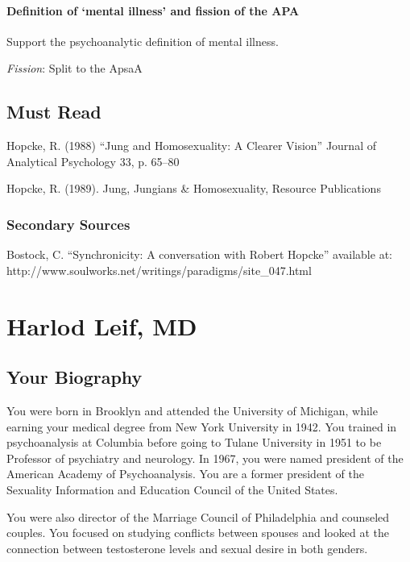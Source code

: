 \begin{refsection}
\subsubsection{Definition of ‘mental illness’ and fission of the APA}
\label{definitionof‘mentalillness’andfissionoftheapa}

Support the psychoanalytic definition of mental illness.

\emph{Fission}: Split to the ApsaA

\section{Must Read}
\label{mustread}

Hopcke, R. (1988) “Jung and Homosexuality: A Clearer Vision” Journal of Analytical Psychology 33, p. 65--80

Hopcke, R. (1989). Jung, Jungians \& Homosexuality, Resource Publications

\subsection{Secondary Sources}
\label{secondarysources}

Bostock, C. “Synchronicity: A conversation with Robert Hopcke” available at: http:\slash \slash www.soulworks.net\slash writings\slash paradigms\slash site\_047.html

\chapter{Harlod Leif, MD}
\label{harlodleifmd}

\section{Your Biography}
\label{yourbiography}

You were born in Brooklyn and attended the University of Michigan, while earning your medical degree from New York University in 1942. You trained in psychoanalysis at Columbia before going to Tulane University in 1951 to be Professor of psychiatry and neurology. In 1967, you were named president of the American Academy of Psychoanalysis. You are a former president of the Sexuality Information and Education Council of the United States.

You were also director of the Marriage Council of Philadelphia and counseled couples. You focused on studying conflicts between spouses and looked at the connection between testosterone levels and sexual desire in both genders.


\end{refsection}
